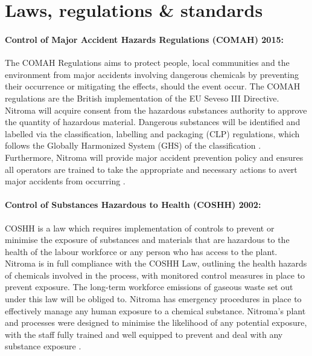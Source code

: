 \section{Laws, regulations \& standards}

\paragraph{Control of Major Accident Hazards Regulations (COMAH) 2015:} 

The COMAH Regulations aims to protect people, local communities and the environment from major accidents involving dangerous chemicals by preventing their occurrence or mitigating the effects, should the event occur. The COMAH regulations are the British implementation of the EU Seveso III Directive. Nitroma will acquire consent from the hazardous substances authority to approve the quantity of hazardous material. Dangerous substances will be identified and labelled via the classification, labelling and packaging (CLP) regulations, which follows the Globally Harmonized System (GHS) of the classification \cite{health_and_safety_executive_chemical_nodate}. Furthermore, Nitroma will provide major accident prevention policy and ensures all operators are trained to take the appropriate and necessary actions to avert major accidents from occurring \cite{health_and_safety_executive_understanding_2015}. 

\paragraph{Control of Substances Hazardous to Health (COSHH) 2002:}

COSHH is a law which requires implementation of controls to prevent or minimise the exposure of substances and materials that are hazardous to the health of the labour workforce or any person who has access to the plant. Nitroma is in full compliance with the COSHH Law, outlining the health hazards of chemicals involved in the process, with monitored control measures in place to prevent exposure. The long-term workforce emissions of gaseous waste set out under this law will be obliged to. Nitroma has emergency procedures in place to effectively manage any human exposure to a chemical substance. Nitroma’s plant and processes were designed to minimise the likelihood of any potential exposure, with the staff fully trained and well equipped to prevent and deal with any substance exposure \cite{health_and_safety_executive_control_nodate}. 

